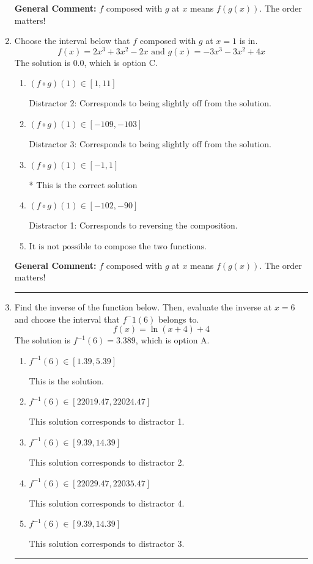 \documentclass{extbook}[14pt]
\newcommand{\litem}[1]{\item #1

\rule{\textwidth}{0.4pt}}
\begin{document}
\begin{enumerate}
{\begin{enumerate}[label=\Alph*.]
\end{enumerate}

\textbf{General Comment:} $f$ composed with $g$ at $x$ means $f(g(x))$. The order matters!
}
\litem{
Choose the interval below that $f$ composed with $g$ at $x=1$ is in.
\[ f(x) = 2x^{3} +3 x^{2} -2 x \text{ and } g(x) = -3x^{3} -3 x^{2} +4 x \]The solution is \( 0.0 \), which is option C.\begin{enumerate}[label=\Alph*.]
\item \( (f \circ g)(1) \in [1, 11] \)

 Distractor 2: Corresponds to being slightly off from the solution.
\item \( (f \circ g)(1) \in [-109, -103] \)

 Distractor 3: Corresponds to being slightly off from the solution.
\item \( (f \circ g)(1) \in [-1, 1] \)

* This is the correct solution
\item \( (f \circ g)(1) \in [-102, -90] \)

 Distractor 1: Corresponds to reversing the composition.
\item \( \text{It is not possible to compose the two functions.} \)


\end{enumerate}

\textbf{General Comment:} $f$ composed with $g$ at $x$ means $f(g(x))$. The order matters!
}
\litem{
Find the inverse of the function below. Then, evaluate the inverse at $x = 6$ and choose the interval that $f^-1(6)$ belongs to.
\[ f(x) = \ln{(x+4)}+4 \]The solution is \( f^{-1}(6) = 3.389 \), which is option A.\begin{enumerate}[label=\Alph*.]
\item \( f^{-1}(6) \in [1.39, 5.39] \)

 This is the solution.
\item \( f^{-1}(6) \in [22019.47, 22024.47] \)

 This solution corresponds to distractor 1.
\item \( f^{-1}(6) \in [9.39, 14.39] \)

 This solution corresponds to distractor 2.
\item \( f^{-1}(6) \in [22029.47, 22035.47] \)

 This solution corresponds to distractor 4.
\item \( f^{-1}(6) \in [9.39, 14.39] \)

 This solution corresponds to distractor 3.
\end{enumerate}

}
\end{enumerate}
\end{document}
